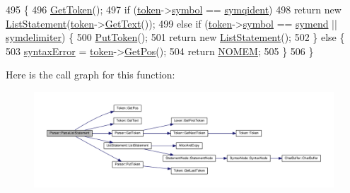 \begin{DoxyCode}
495 \{
496     \hyperlink{classParser_a415a103e66558b4d366d9a1420561fe3}{GetToken}();
497     \textcolor{keywordflow}{if} (\hyperlink{classParser_a467028559d31c5b33f16ca8be56715cc}{token}->\hyperlink{structToken_aa671eaaae5632c5277e89a090d864820}{symbol} == \hyperlink{lex_8h_a7feef761cd73fac6e25b8bb80d2c4e54a9a4f2a8a367485e87d9faf675bec17af}{symqident})
498         \textcolor{keywordflow}{return} \textcolor{keyword}{new} \hyperlink{classListStatement}{ListStatement}(\hyperlink{classParser_a467028559d31c5b33f16ca8be56715cc}{token}->\hyperlink{structToken_a15f1043de07ce8e452fbf115b85def71}{GetText}());
499     \textcolor{keywordflow}{else} \textcolor{keywordflow}{if} (\hyperlink{classParser_a467028559d31c5b33f16ca8be56715cc}{token}->\hyperlink{structToken_aa671eaaae5632c5277e89a090d864820}{symbol} == \hyperlink{lex_8h_a7feef761cd73fac6e25b8bb80d2c4e54a9be8426421896b360944c1313abeffdb}{symend} || \hyperlink{lex_8h_a7feef761cd73fac6e25b8bb80d2c4e54ac8e5e4f0940e69be4fca18ed8cbb236f}{symdelimiter}) \{
500         \hyperlink{classParser_adb5c3a188b36f7ecb198ae30f06338b3}{PutToken}();
501         \textcolor{keywordflow}{return} \textcolor{keyword}{new} \hyperlink{classListStatement}{ListStatement}();
502     \} \textcolor{keywordflow}{else} \{
503         \hyperlink{classParser_ae50a199b804c9f5e8342a4d0a1ae6a95}{syntaxError} = \hyperlink{classParser_a467028559d31c5b33f16ca8be56715cc}{token}->\hyperlink{structToken_a5f93ea94940a6eeb060507e1da594599}{GetPos}();
504         \textcolor{keywordflow}{return} \hyperlink{platform_8h_a46ff2bfbf0d44b8466a2251d5bd5e6f8}{NOMEM};
505     \}
506 \}
\end{DoxyCode}


Here is the call graph for this function\+:\nopagebreak
\begin{figure}[H]
\begin{center}
\leavevmode
\includegraphics[width=350pt]{classParser_aa0642d13c500401b168035f9fcdbe1f4_cgraph}
\end{center}
\end{figure}





